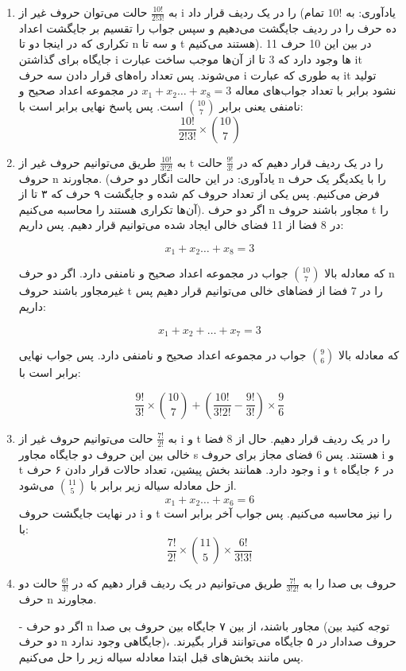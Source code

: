 \begin{enumerate}
    \item 
     به
$\frac{10!}{2!3!}$
حالت می‌توان حروف غیر از i را در یک ردیف قرار داد
(یادآوری: به 
$10!$
تمام ده حرف را در ردیف جایگشت می‌دهیم و سپس جواب را تقسیم بر جایگشت اعداد تکراری که در اینجا دو تا n و سه تا t هستند می‌کنیم).
در بین این 10 حرف 11 جایگاه برای گذاشتن i ها وجود دارد که 3 تا از آن‌ها موجب ساخت عبارت it می‌شوند.
پس تعداد راه‌های قرار دادن سه حرف i به طوری که عبارت it تولید نشود برابر با تعداد جواب‌های معاله
$x_1 + x_2 \ldots + x_8 = 3$
در مجموعه اعداد صحیح و نامنفی یعنی برابر
$\binom{10}{7}$
است. پس پاسخ نهایی برابر است با:
$$\frac{10!}{2!3!}  \times \binom{10}{7}$$

\item
به
$\frac{10!}{3!2!}$
طریق می‌توانیم حروف غیر از t را در یک ردیف قرار دهیم که در 
$\frac{9!}{3!}$
حالت حروف n مجاورند.
(یادآوری: در این حالت انگار دو حرف n را با یکدیگر یک حرف فرض می‌کنیم. پس یکی از تعداد حروف کم شده و جایگشت ۹ حرف که ۳ تا از آن‌ها تکراری هستند را محاسبه می‌کنیم).
اگر دو حرف n مجاور باشند حروف t را در 8 فضا از 11 فضای خالی ایجاد شده می‌توانیم قرار دهیم. پس داریم:

$$x_1 + x_2 \ldots + x_8 = 3$$

که معادله بالا 
$\binom{10}{7}$
جواب در مجموعه اعداد صحیح و نامنفی دارد.
اگر دو حرف n غیرمجاور باشند حروف t را در 7 فضا از فضاهای خالی می‌توانیم قرار دهیم پس داریم:

$$x_1 + x_2 + \ldots + x_7 = 3$$

که معادله بالا 
$\binom{9}{6}$
جواب در مجموعه اعداد صحیح و نامنفی دارد. 
پس جواب نهایی برابر است با:

$$\frac{9!}{3!}\times\binom{10}{7} + (\frac{10!}{3!2!} - \frac{9!}{3!})\times\frac{9}{6}$$

\item
به
$\frac{7!}{2!}$
حالت
می‌توانیم حروف غیر از i و t را در یک ردیف قرار دهیم. حال از 8 فضا خالی بین این حروف دو جایگاه مجاور s هستند. پس 6 فضای مجاز برای حروف i و t وجود دارد.
همانند بخش پیشین، تعداد حالات قرار دادن ۶ حرف i و t در ۶ جایگاه از حل معادله سیاله زیر برابر با 
$\binom{11}{5}$
می‌شود.
$$x_1 + x_2 \ldots + x_6 = 6$$
در نهایت جایگشت حروف i و t را نیز محاسبه می‌کنیم.
پس جواب آخر برابر است با:
$$\frac{7!}{2!}\times\binom{11}{5}\times\frac{6!}{3!3!}$$

\item
حروف بی صدا را به 
$\frac{7!}{3!2!}$
طریق می‌توانیم در یک ردیف قرار دهیم که در 
$\frac{6!}{3!}$
حالت دو حرف n مجاورند.

-
اگر دو حرف n مجاور باشند، 
از بین ۷ جایگاه بین حروف بی صدا (توجه کنید بین دو حرف n جایگاهی وجود ندارد)، حروف صدادار در ۵ جایگاه می‌توانند قرار بگیرند.
پس مانند بخش‌های قبل ابتدا معادله سیاله زیر را حل می‌کنیم.


\end{enumerate}
